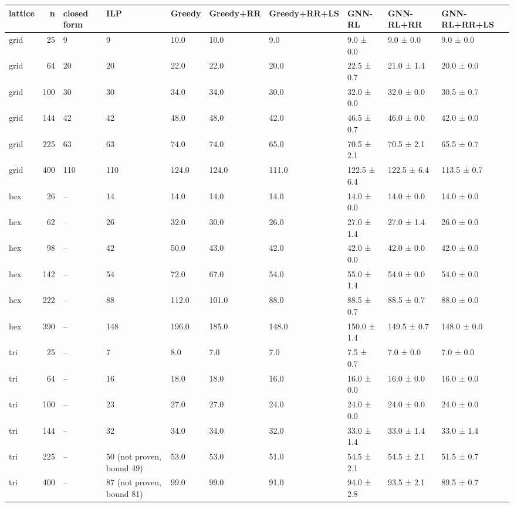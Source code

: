 \begin{tabular}{lrllllllll}
\toprule
lattice & n & closed form & ILP & Greedy & Greedy+RR & Greedy+RR+LS & GNN-RL & GNN-RL+RR & GNN-RL+RR+LS \\
\midrule
grid & 25 & 9 & 9 & 10.0 & 10.0 & 9.0 & 9.0 ± 0.0 & 9.0 ± 0.0 & 9.0 ± 0.0 \\
grid & 64 & 20 & 20 & 22.0 & 22.0 & 20.0 & 22.5 ± 0.7 & 21.0 ± 1.4 & 20.0 ± 0.0 \\
grid & 100 & 30 & 30 & 34.0 & 34.0 & 30.0 & 32.0 ± 0.0 & 32.0 ± 0.0 & 30.5 ± 0.7 \\
grid & 144 & 42 & 42 & 48.0 & 48.0 & 42.0 & 46.5 ± 0.7 & 46.0 ± 0.0 & 42.0 ± 0.0 \\
grid & 225 & 63 & 63 & 74.0 & 74.0 & 65.0 & 70.5 ± 2.1 & 70.5 ± 2.1 & 65.5 ± 0.7 \\
grid & 400 & 110 & 110 & 124.0 & 124.0 & 111.0 & 122.5 ± 6.4 & 122.5 ± 6.4 & 113.5 ± 0.7 \\
hex & 26 & -- & 14 & 14.0 & 14.0 & 14.0 & 14.0 ± 0.0 & 14.0 ± 0.0 & 14.0 ± 0.0 \\
hex & 62 & -- & 26 & 32.0 & 30.0 & 26.0 & 27.0 ± 1.4 & 27.0 ± 1.4 & 26.0 ± 0.0 \\
hex & 98 & -- & 42 & 50.0 & 43.0 & 42.0 & 42.0 ± 0.0 & 42.0 ± 0.0 & 42.0 ± 0.0 \\
hex & 142 & -- & 54 & 72.0 & 67.0 & 54.0 & 55.0 ± 1.4 & 54.0 ± 0.0 & 54.0 ± 0.0 \\
hex & 222 & -- & 88 & 112.0 & 101.0 & 88.0 & 88.5 ± 0.7 & 88.5 ± 0.7 & 88.0 ± 0.0 \\
hex & 390 & -- & 148 & 196.0 & 185.0 & 148.0 & 150.0 ± 1.4 & 149.5 ± 0.7 & 148.0 ± 0.0 \\
tri & 25 & -- & 7 & 8.0 & 7.0 & 7.0 & 7.5 ± 0.7 & 7.0 ± 0.0 & 7.0 ± 0.0 \\
tri & 64 & -- & 16 & 18.0 & 18.0 & 16.0 & 16.0 ± 0.0 & 16.0 ± 0.0 & 16.0 ± 0.0 \\
tri & 100 & -- & 23 & 27.0 & 27.0 & 24.0 & 24.0 ± 0.0 & 24.0 ± 0.0 & 24.0 ± 0.0 \\
tri & 144 & -- & 32 & 34.0 & 34.0 & 32.0 & 33.0 ± 1.4 & 33.0 ± 1.4 & 33.0 ± 1.4 \\
tri & 225 & -- & 50 (not proven, bound 49) & 53.0 & 53.0 & 51.0 & 54.5 ± 2.1 & 54.5 ± 2.1 & 51.5 ± 0.7 \\
tri & 400 & -- & 87 (not proven, bound 81) & 99.0 & 99.0 & 91.0 & 94.0 ± 2.8 & 93.5 ± 2.1 & 89.5 ± 0.7 \\
\bottomrule
\end{tabular}
